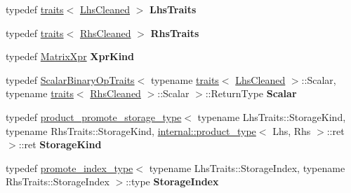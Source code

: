 \begin{DoxyCompactItemize}
typedef \hyperlink{struct_eigen_1_1internal_1_1traits}{traits}$<$ \hyperlink{group___sparse_core___module}{Lhs\+Cleaned} $>$ {\bfseries Lhs\+Traits}
\item 
\mbox{\label{struct_eigen_1_1internal_1_1traits_3_01_product_3_01_lhs_00_01_rhs_00_01_option_01_4_01_4_a5c368e4a12fcde66f08ea07ab706c037}} 
typedef \hyperlink{struct_eigen_1_1internal_1_1traits}{traits}$<$ \hyperlink{group___sparse_core___module}{Rhs\+Cleaned} $>$ {\bfseries Rhs\+Traits}
\item 
\mbox{\label{struct_eigen_1_1internal_1_1traits_3_01_product_3_01_lhs_00_01_rhs_00_01_option_01_4_01_4_a120ac65f1353062ed28220521a12cbb4}} 
typedef \hyperlink{struct_eigen_1_1_matrix_xpr}{Matrix\+Xpr} {\bfseries Xpr\+Kind}
\item 
\mbox{\label{struct_eigen_1_1internal_1_1traits_3_01_product_3_01_lhs_00_01_rhs_00_01_option_01_4_01_4_a780b9b2fadba314795f26828b0a595f2}} 
typedef \hyperlink{group___core___module_struct_eigen_1_1_scalar_binary_op_traits}{Scalar\+Binary\+Op\+Traits}$<$ typename \hyperlink{struct_eigen_1_1internal_1_1traits}{traits}$<$ \hyperlink{group___sparse_core___module}{Lhs\+Cleaned} $>$\+::Scalar, typename \hyperlink{struct_eigen_1_1internal_1_1traits}{traits}$<$ \hyperlink{group___sparse_core___module}{Rhs\+Cleaned} $>$\+::Scalar $>$\+::Return\+Type {\bfseries Scalar}
\item 
\mbox{\label{struct_eigen_1_1internal_1_1traits_3_01_product_3_01_lhs_00_01_rhs_00_01_option_01_4_01_4_a6730dadec4953678689c03ff60f6ad7e}} 
typedef \hyperlink{struct_eigen_1_1internal_1_1product__promote__storage__type}{product\+\_\+promote\+\_\+storage\+\_\+type}$<$ typename Lhs\+Traits\+::\+Storage\+Kind, typename Rhs\+Traits\+::\+Storage\+Kind, \hyperlink{struct_eigen_1_1internal_1_1product__type}{internal\+::product\+\_\+type}$<$ Lhs, Rhs $>$\+::ret $>$\+::ret {\bfseries Storage\+Kind}
\item 
\mbox{\label{struct_eigen_1_1internal_1_1traits_3_01_product_3_01_lhs_00_01_rhs_00_01_option_01_4_01_4_ad010e31abcd1be347b28e292a4b2a924}} 
typedef \hyperlink{struct_eigen_1_1internal_1_1promote__index__type}{promote\+\_\+index\+\_\+type}$<$ typename Lhs\+Traits\+::\+Storage\+Index, typename Rhs\+Traits\+::\+Storage\+Index $>$\+::type {\bfseries Storage\+Index}
\end{DoxyCompactItemize}


